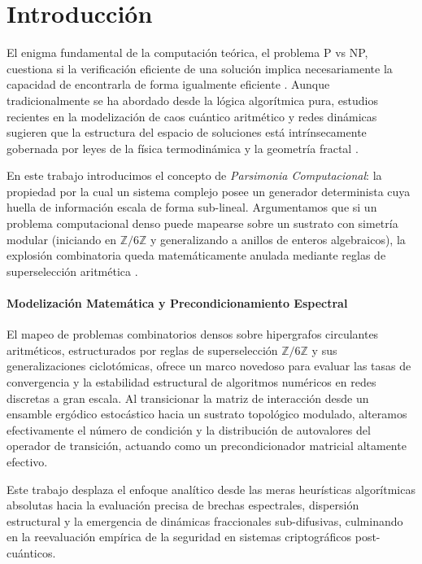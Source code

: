 \documentclass[sn-mathphys]{sn-jnl}
\theoremstyle{definition} %
\newcommand{\Zmod}{\mathbb{Z}/6\mathbb{Z}}
\begin{document}
\section{Introducción}

El enigma fundamental de la computación teórica, el problema P vs NP, cuestiona si la verificación eficiente de una solución implica necesariamente la capacidad de encontrarla de forma igualmente eficiente \cite{Karp1972}. Aunque tradicionalmente se ha abordado desde la lógica algorítmica pura, estudios recientes en la modelización de caos cuántico aritmético y redes dinámicas sugieren que la estructura del espacio de soluciones está intrínsecamente gobernada por leyes de la física termodinámica y la geometría fractal \cite{Srednicki1994, Mehta2004}.

En este trabajo introducimos el concepto de \textit{Parsimonia Computacional}: la propiedad por la cual un sistema complejo posee un generador determinista cuya huella de información escala de forma sub-lineal. Argumentamos que si un problema computacional denso puede mapearse sobre un sustrato con simetría modular (iniciando en $\Zmod$ y generalizando a anillos de enteros algebraicos), la explosión combinatoria queda matemáticamente anulada mediante reglas de superselección aritmética \cite{Connes2008, Sarnak1995}.

\paragraph{Modelización Matemática y Precondicionamiento Espectral}
El mapeo de problemas combinatorios densos sobre hipergrafos circulantes aritméticos, estructurados por reglas de superselección $\Zmod$ y sus generalizaciones ciclotómicas, ofrece un marco novedoso para evaluar las tasas de convergencia y la estabilidad estructural de algoritmos numéricos en redes discretas a gran escala. Al transicionar la matriz de interacción desde un ensamble ergódico estocástico hacia un sustrato topológico modulado, alteramos efectivamente el número de condición y la distribución de autovalores del operador de transición, actuando como un precondicionador matricial altamente efectivo. 

Este trabajo desplaza el enfoque analítico desde las meras heurísticas algorítmicas absolutas hacia la evaluación precisa de brechas espectrales, dispersión estructural y la emergencia de dinámicas fraccionales sub-difusivas, culminando en la reevaluación empírica de la seguridad en sistemas criptográficos post-cuánticos.
\end{document}
